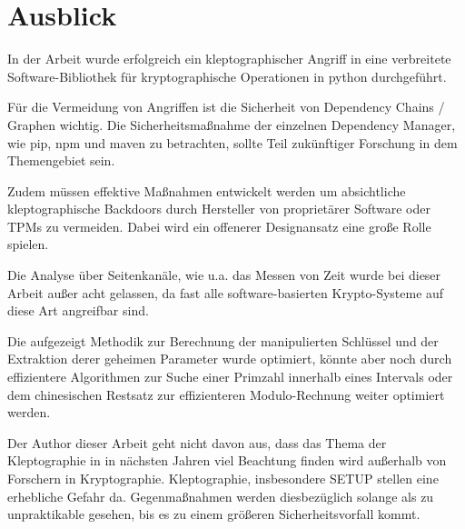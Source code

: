\chapter{Ausblick}
    In der Arbeit wurde erfolgreich ein kleptographischer Angriff in eine verbreitete Software-Bibliothek für kryptographische Operationen in python durchgeführt. 

    Für die Vermeidung von Angriffen ist die Sicherheit von Dependency Chains / Graphen wichtig. Die Sicherheitsmaßnahme der einzelnen Dependency Manager, wie pip, npm und maven zu betrachten, sollte Teil zukünftiger Forschung in dem Themengebiet sein.

    Zudem müssen effektive Maßnahmen entwickelt werden um absichtliche kleptographische Backdoors durch Hersteller von proprietärer Software oder \ac{TPM}s zu vermeiden. Dabei wird ein offenerer Designansatz eine große Rolle spielen.

    Die Analyse über Seitenkanäle, wie u.a. das Messen von Zeit wurde bei dieser Arbeit außer acht gelassen, da fast alle software-basierten Krypto-Systeme auf diese Art angreifbar sind.
    
    Die aufgezeigt Methodik zur Berechnung der manipulierten Schlüssel und der Extraktion derer geheimen Parameter wurde optimiert, könnte aber noch durch effizientere Algorithmen zur Suche einer Primzahl innerhalb eines Intervals oder dem chinesischen Restsatz zur effizienteren Modulo-Rechnung weiter optimiert werden.

    Der Author dieser Arbeit geht nicht davon aus, dass das Thema der Kleptographie in in nächsten Jahren viel Beachtung finden wird außerhalb von Forschern in Kryptographie. 
    Kleptographie, insbesondere \ac{SETUP} stellen eine erhebliche Gefahr da. Gegenmaßnahmen werden diesbezüglich solange als zu unpraktikable gesehen, bis es zu einem größeren Sicherheitsvorfall kommt.
